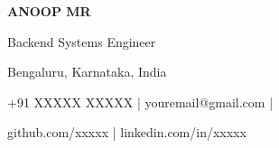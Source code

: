 \begin{center}
    {\Huge \textbf{ANOOP MR}}

    Backend Systems Engineer

    Bengaluru, Karnataka, India

    +91 XXXXX XXXXX \;|\;
    youremail@gmail.com \;|\;

    github.com/xxxxx \;|\;
    linkedin.com/in/xxxxx
\end{center}
